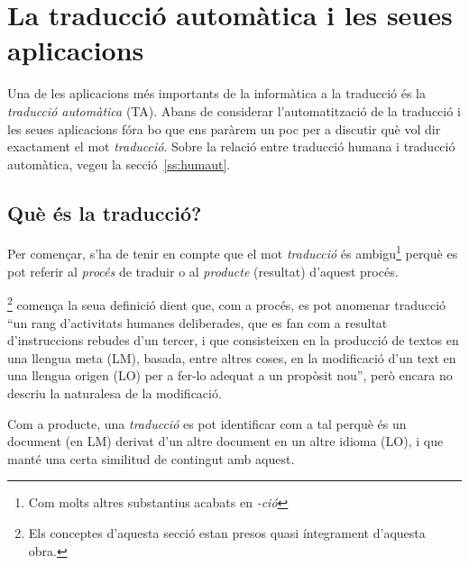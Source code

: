 \chapter{La traducció automàtica i les seues aplicacions}
\label{se:UTA}
\label{se:TiTA}

Una de les aplicacions més importants de la informàtica a la traducció
és la \emph{traducció automàtica} (TA).  Abans de considerar
l'automatització de la traducció i les seues aplicacions fóra bo que
ens paràrem un poc per a discutir què vol dir exactament el mot
\emph{traducció}. Sobre la relació entre traducció humana i traducció
automàtica, vegeu la secció~\ref{ss:humaut}.

\section{Què és la traducció?}
\label{ss:trad}

Per començar, s'ha de tenir en compte que el mot \emph{traducció} és
ambigu\footnote{Com molts altres substantius acabats en \emph{-ció}}
perquè es pot referir al \emph{procés} de traduir o al \emph{producte}
(resultat) d'aquest procés.

\citet{sager93b}\footnote{Els conceptes d'aquesta secció estan presos
  quasi íntegrament d'aquesta obra.} comença la seua definició dient
que, com a procés, es pot anomenar traducció ``un rang d'activitats
humanes deliberades, que es fan com a resultat d'instruccions rebudes
d'un tercer, i que consisteixen en la producció de textos en una
llengua meta (LM), basada, entre altres coses, en la modificació d'un
text en una llengua origen (LO) per a fer-lo adequat a un propòsit
nou'', però encara no descriu la naturalesa de la modificació.

Com a producte, una \emph{traducció} es pot identificar com a tal
perquè és un document (en LM)  derivat d'un altre document en un altre
idioma (LO), i que manté una certa similitud de contingut amb aquest.

